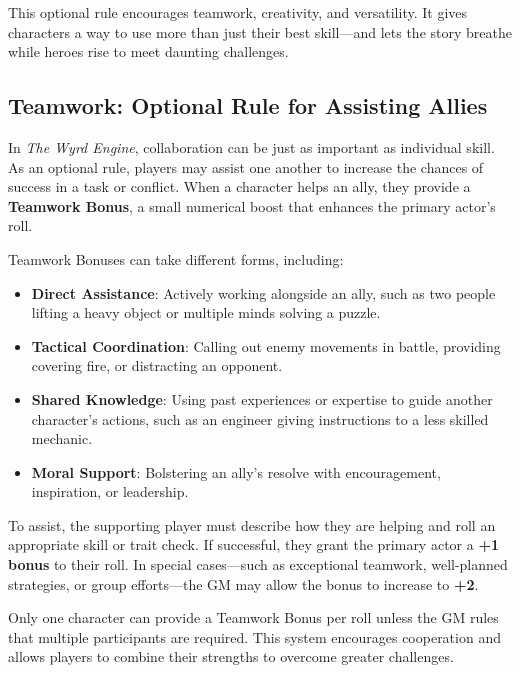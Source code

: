 This optional rule encourages teamwork, creativity, and versatility. It gives characters a way to use more than just their best skill—and lets the story breathe while heroes rise to meet daunting challenges.



\subsection{Teamwork: Optional Rule for Assisting Allies}

In \textit{The Wyrd Engine}, collaboration can be just as important as individual skill. As an optional rule, players may assist one another to increase the chances of success in a task or conflict. When a character helps an ally, they provide a \textbf{Teamwork Bonus}, a small numerical boost that enhances the primary actor’s roll.  

Teamwork Bonuses can take different forms, including:  

\begin{itemize}
    \item \textbf{Direct Assistance}: Actively working alongside an ally, such as two people lifting a heavy object or multiple minds solving a puzzle.  
    \item \textbf{Tactical Coordination}: Calling out enemy movements in battle, providing covering fire, or distracting an opponent.  
    \item \textbf{Shared Knowledge}: Using past experiences or expertise to guide another character’s actions, such as an engineer giving instructions to a less skilled mechanic.  
    \item \textbf{Moral Support}: Bolstering an ally’s resolve with encouragement, inspiration, or leadership.  
\end{itemize}

To assist, the supporting player must describe how they are helping and roll an appropriate skill or trait check. If successful, they grant the primary actor a \textbf{+1 bonus} to their roll. In special cases—such as exceptional teamwork, well-planned strategies, or group efforts—the GM may allow the bonus to increase to \textbf{+2}.  

Only one character can provide a Teamwork Bonus per roll unless the GM rules that multiple participants are required. This system encourages cooperation and allows players to combine their strengths to overcome greater challenges.

